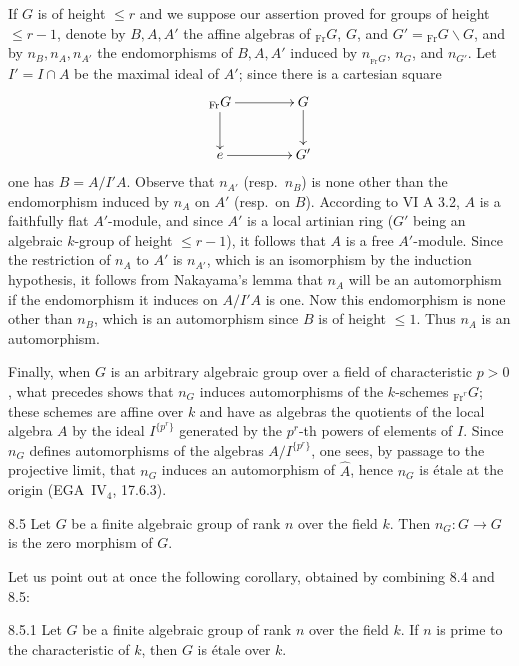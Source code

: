 If $G$ is of height $\leq r$ and we suppose our assertion proved for groups of height $\leq r-1$, denote by $B,A,A'$ the affine algebras of ${}_{\mathrm{Fr}}G$, $G$, and $G'={}_{\mathrm{Fr}}G\backslash G$, and by $n_B,n_A,n_{A'}$ the endomorphisms of $B,A,A'$ induced by $n_{{}_{\mathrm{Fr}}G}$, $n_G$, and $n_{G'}$. Let $I'=I\cap A$ be the maximal ideal of $A'$; since there is a cartesian square
\[
\xymatrix@C=4em{{}_{\mathrm{Fr}}G\ar[r]\ar[d]&G\ar[d]\\e\ar[r]&G'}
\]
one has $B=A/I'A$. Observe that $n_{A'}$ (resp.\ $n_B$) is none other than the endomorphism induced by $n_A$ on $A'$ (resp.\ on $B$). According to VI A 3.2, $A$ is a faithfully flat $A'$-module, and since $A'$ is a local artinian ring ($G'$ being an algebraic $k$-group of height $\leq r-1$), it follows that $A$ is a free $A'$-module. Since the restriction of $n_A$ to $A'$ is $n_{A'}$, which is an isomorphism by the induction hypothesis, it follows from Nakayama's lemma that $n_A$ will be an automorphism if the endomorphism it induces on $A/I'A$ is one. Now this endomorphism is none other than $n_B$, which is an automorphism since $B$ is of height $\leq1$. Thus $n_A$ is an automorphism.

Finally, when $G$ is an arbitrary algebraic group over a field of characteristic $p>0$, what precedes shows that $n_G$ induces automorphisms of the $k$-schemes ${}_{\mathrm{Fr}^r}G$; these schemes are affine over $k$ and have as algebras the quotients of the local algebra $A$ by the ideal $I^{\{p^r\}}$ generated by the $p^r$-th powers of elements of $I$. Since $n_G$ defines automorphisms of the algebras $A/I^{\{p^r\}}$, one sees, by passage to the projective limit, that $n_G$ induces an automorphism of $\widehat A$, hence $n_G$ is \'etale at the origin (EGA~IV$_4$, 17.6.3).

\begin{proposition}{8.5}\label{VIIA.8.5}
Let $G$ be a finite algebraic group of rank $n$ over the field $k$. Then $n_G:G\to G$ is the zero morphism of $G$.
\end{proposition}
Let us point out at once the following corollary, obtained by combining 8.4 and 8.5:
\begin{corollary}{8.5.1}\label{VIIA.8.5.1}
Let $G$ be a finite algebraic group of rank $n$ over the field $k$. If $n$ is prime to the characteristic of $k$, then $G$ is \'etale over $k$.
\end{corollary}

